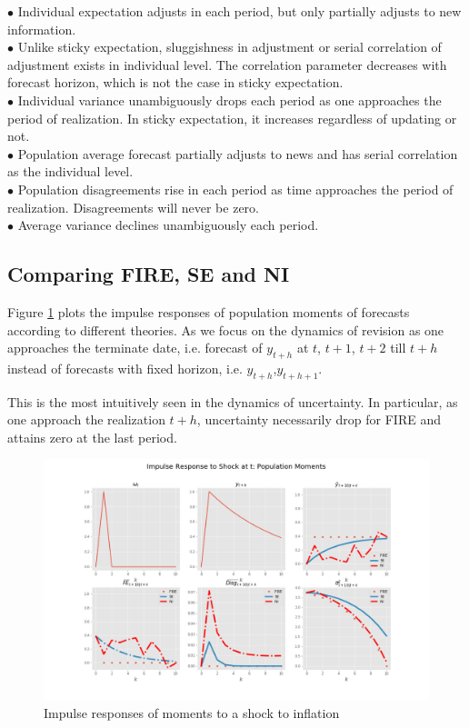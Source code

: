 \documentclass[]{article}
\begin{document}
	$\bullet$  Individual expectation adjusts in each period, but only partially adjusts to new information. \\
	$\bullet$ Unlike sticky expectation, sluggishness in adjustment or serial correlation of adjustment exists in individual level. The correlation parameter decreases with forecast horizon, which is not the case in sticky expectation.\\
	$\bullet$  Individual variance unambiguously drops each period as one approaches the period of realization. In sticky expectation, it increases regardless of updating or not. \\ 
	$\bullet$  Population average forecast partially adjusts to news and has serial correlation as the individual level. \\
	$\bullet$  Population disagreements rise in each period as time approaches the period of realization. Disagreements will never be zero. \\
	$\bullet$  Average variance declines unambiguously each period. 
	
	\subsection{Comparing FIRE, SE and NI}
	
	Figure \ref{ir_pop} plots the impulse responses of population moments of forecasts according to different theories. As we focus on the dynamics of revision as one approaches the terminate date, i.e. forecast of $y_{t+h}$ at $t$, $t+1$, $t+2$ till $t+h$ instead of forecasts with fixed horizon, i.e. $y_{t+h}$,$y_{t+h+1}$. 
	
	This is the most intuitively seen in the dynamics of uncertainty. In particular, as one approach the realization $t+h$, uncertainty necessarily drop for FIRE and attains zero at the last period.  
	
	\begin{figure}[ht]
		\centering
		\includegraphics[width=16cm]{figures/ir_popseni.png} 
		\caption{Impulse responses of moments to a shock to inflation}
		\label{ir_pop}
	\end{figure}
	
\end{document}
